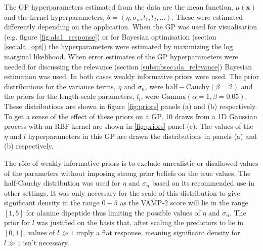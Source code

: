 The GP hyperparameters estimated from the data are the mean function, $\mu(\mathbf{x})$ and the kernel hyperparameters, $\theta = (\eta, \sigma_{n}, l_{1}, l_{2}, ...)$. These were estimated differently depending on the application. When the GP was used for visualisation (e.g. figure \ref{fig:ala1_response}) or for Bayesian optimisation (section \ref{sec:ala_opt}) the hyperparameters were estimated by maximizing the log marginal likelihood. When error estimates of the GP hyperparameters were needed for discussing the relevance (section \ref{subsubsec:ala_relevance}) Bayesian estimation was used. In both cases  weakly informative priors were used. The prior distributions for the variance terms, $\eta$ and $\sigma_{n}$, were $\mathrm{half-Cauchy}(\beta=2)$ and the priors for the length-scale parameters, $l_{i}$, were $\mathrm{Gamma}(\alpha=1, \beta=0.05)$. These distributions are shown in figure \ref{fig:priors} panels (a) and (b) respectively.  To get a sense of the effect of these priors on a GP, 10 draws from a 1D Gaussian process with an RBF kernel are shown in  \ref{fig:priors} panel (c). The values of the $\eta$ and $l$ hyperparameters in this GP are drawn the distributions in panels (a) and (b) respectively.  

The r\^ole of weakly informative priors is to exclude unrealistic or disallowed values of the parameters without imposing strong prior beliefs on the true values\cite{gelmanBayesianDataAnalysis2014}. The half-Cauchy distribution  was used for $\eta$ and $\sigma_n$  based on its recommended use in other settings\cite{polsonHalfCauchyPriorGlobal2012}. It was only necessary for the scale of this distribution to give significant density in the range $0-5$ as the VAMP-2 score will lie in the range $[1,5]$ for alanine dipeptide thus limiting the possible values of $\eta$ and $\sigma_{n}$. The prior for $l$ was justified on the basis that, after scaling the predictors to lie in $[0, 1]$, values of $l \gg 1$ imply a flat response, meaning significant density for $l \gg 1$ isn't necessary. 

